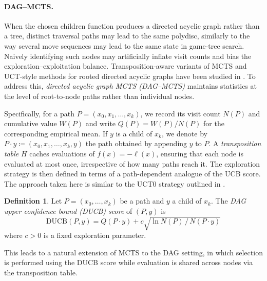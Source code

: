 \documentclass[10pt]{article}
\theoremstyle{definition}
\newtheorem{definition}[theorem]{Definition}
\begin{document}
\paragraph{DAG--MCTS.} When the chosen children function produces a directed acyclic graph rather than a tree, distinct traversal paths may lead to the same polydisc, similarly to the way several move sequences may lead to the same state in game-tree search.
Naively identifying such nodes may artificially inflate visit counts and bias the exploration--exploitation balance.  Transposition-aware variants of MCTS and UCT-style methods for rooted directed acyclic graphs have been studied in \cite{childs2008transpositions,saffidine2012ucd}. To address this, \emph{directed acyclic graph MCTS (DAG--MCTS)} maintains statistics at the level of root-to-node paths rather than individual nodes.

Specifically, for a path $P = (x_0, x_1, \ldots, x_k)$, we record its visit count $N(P)$ and cumulative value $W(P)$ and write $Q(P) = W(P)/N(P)$ for the corresponding empirical mean. If $y$ is a child of $x_k$, we denote by $P \cdot y\coloneqq (x_0, x_1, \ldots, x_k, y)$ the path obtained by appending $y$ to $P$. A \emph{transposition table} $H$ caches evaluations of $f(x) = -\ell(x)$, ensuring that each node is evaluated at most once, irrespective of how many paths reach it. The exploration strategy is then defined in terms of a path-dependent analogue of the UCB score. The approach taken here is similar to the UCT0 strategy outlined in \cite{childs2008transpositions}.

\begin{definition}
    Let $P = (x_0, \dotsc, x_k)$ be a path and $y$ a child of $x_k$. The \emph{DAG upper confidence bound (DUCB) score} of $(P, y)$ is
    $$
        \mathrm{DUCB}(P, y) = Q(P \cdot y) + c\sqrt{\ln N(P)\,/\,N(P \cdot y)}
    $$
    where $c > 0$ is a fixed exploration parameter.
\end{definition}

This leads to a natural extension of MCTS to the DAG setting, in which selection is performed using the DUCB score while evaluation is shared across nodes via the transposition table.
\end{document}
